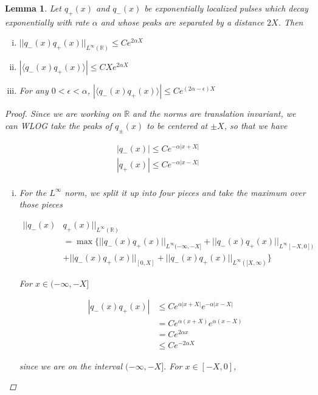 \documentclass[12pt]{article}
\def\R{{\mathbb R}}
\newtheorem{lemma}{Lemma}
\begin{document}
\begin{lemma}\label{exploc}
Let $q_+(x)$ and $q_-(x)$ be exponentially localized pulses which decay exponentially with rate $\alpha$ and whose peaks are separated by a distance $2 X$. Then 

\begin{enumerate}[(i)]
	\item $ || q_-(x) q_+(x)||_{L^\infty(\R)} \leq C e^{2 \alpha X}$ 
	\item $ | \langle q_-(x) q_+(x) \rangle | \leq C X e^{2 \alpha X}$ 
	\item For any $0 < \epsilon < \alpha$, $| \langle q_-(x) q_+(x) \rangle | \leq C e^{(2 \alpha - \epsilon) X}$ 
\end{enumerate}

\begin{proof}
Since we are working on $\R$ and the norms are translation invariant, we can WLOG take the peaks of $q_\pm(x)$ to be centered at $\pm X$, so that we have

\begin{align*}
|q_-(x)| \leq C e^{-\alpha|x + X|} \\
|q_+(x)| \leq C e^{-\alpha|x - X|} \\
\end{align*}

\begin{enumerate}[(i)]

\item For the $L^\infty$ norm, we split it up into four pieces and take the maximum over those pieces

\begin{align*}
|| q_-(x) & q_+(x)||_{L^\infty(\R)} \\
&= \max\{ || q_-(x) q_+(x)||_{L^\infty(-\infty, -X]} + || q_-(x) q_+(x)||_{L^\infty[-X, 0])} \\
&+ || q_-(x) q_+(x)||_{[0, X]} + || q_-(x) q_+(x)||_{L^\infty([X, \infty)} \}
\end{align*}

For $x \in (-\infty, -X]$ 

\begin{align*}
| q_-(x) q_+(x) | &\leq C e^{\alpha|x + X|} e^{-\alpha|x - X|} \\
&= C e^{\alpha(x + X)} e^{\alpha(x - X)} \\
&= C e^{2 \alpha x} \\
&\leq C e^{-2 \alpha X} 
\end{align*}

since we are on the interval $(-\infty, -X]$. For $x \in [-X,0]$, 


\end{enumerate}
\end{proof}
\end{lemma}
\end{document}

